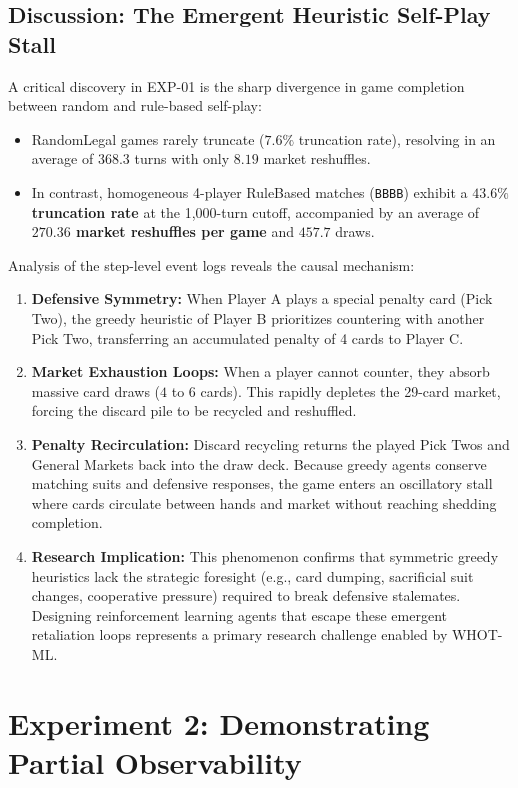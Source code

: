\documentclass[11pt]{article}
\begin{document}
\subsection{Discussion: The Emergent Heuristic Self-Play Stall}
\label{sec:exp01_characterization}
A critical discovery in EXP-01 is the sharp divergence in game completion between random and rule-based self-play:
\begin{itemize}
  \item RandomLegal games rarely truncate ($7.6\%$ truncation rate), resolving in an average of $368.3$ turns with only $8.19$ market reshuffles.
  \item In contrast, homogeneous 4-player RuleBased matches (\texttt{BBBB}) exhibit a \textbf{$43.6\%$ truncation rate} at the 1,000-turn cutoff, accompanied by an average of \textbf{$270.36$ market reshuffles per game} and $457.7$ draws.
\end{itemize}

Analysis of the step-level event logs reveals the causal mechanism:
\begin{enumerate}
  \item \textbf{Defensive Symmetry:} When Player A plays a special penalty card (Pick Two), the greedy heuristic of Player B prioritizes countering with another Pick Two, transferring an accumulated penalty of 4 cards to Player C.
  \item \textbf{Market Exhaustion Loops:} When a player cannot counter, they absorb massive card draws ($4$ to $6$ cards). This rapidly depletes the 29-card market, forcing the discard pile to be recycled and reshuffled.
  \item \textbf{Penalty Recirculation:} Discard recycling returns the played Pick Twos and General Markets back into the draw deck. Because greedy agents conserve matching suits and defensive responses, the game enters an oscillatory stall where cards circulate between hands and market without reaching shedding completion.
  \item \textbf{Research Implication:} This phenomenon confirms that symmetric greedy heuristics lack the strategic foresight (e.g., card dumping, sacrificial suit changes, cooperative pressure) required to break defensive stalemates. Designing reinforcement learning agents that escape these emergent retaliation loops represents a primary research challenge enabled by WHOT-ML.
\end{enumerate}


\section{Experiment 2: Demonstrating Partial Observability}
\end{document}
